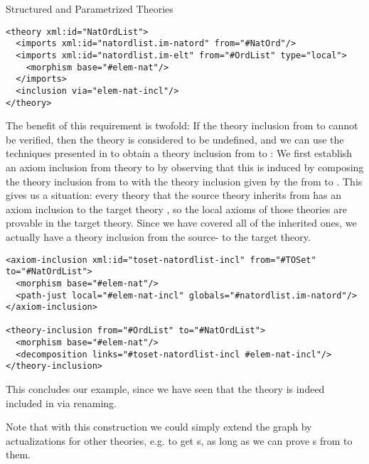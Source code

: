\begin{tchapter}[id=natlist]{Structured and Parametrized Theories}
\begin{lstlisting}[mathescape,label=lst:nat-list,
  index={theory,imports,morphism,inclusion}]
<theory xml:id="NatOrdList">
  <imports xml:id="natordlist.im-natord" from="#NatOrd"/>
  <imports xml:id="natordlist.im-elt" from="#OrdList" type="local">
    <morphism base="#elem-nat"/>
  </imports>
  <inclusion via="elem-nat-incl"/>
</theory>
\end{lstlisting}
The benefit of this {} requirement is twofold: If the theory inclusion
from {} to {} cannot be verified, then the theory
{} is considered to be undefined, and we can use the
{} techniques presented in {} to
obtain a theory inclusion from {} to {}: We first
establish an axiom inclusion from theory {} to {} by
observing that this is induced by composing the theory inclusion from {} to
{} with the theory inclusion given by the {} from
{} to {}. This gives us a
{} situation: every theory that the source theory {}
inherits from has an axiom inclusion to the target theory {}, so the
local axioms of those theories are provable in the target theory. Since we have covered
all of the inherited ones, we actually have a theory inclusion from the source- to the
target theory.

\begin{lstlisting}[mathescape,label=lst:nat-list-inclusions,
  index={theory,imports,morphism,inclusion}]
<axiom-inclusion xml:id="toset-natordlist-incl" from="#TOSet" to="#NatOrdList">
  <morphism base="#elem-nat"/>
  <path-just local="#elem-nat-incl" globals="#natordlist.im-natord"/>
</axiom-inclusion>

<theory-inclusion from="#OrdList" to="#NatOrdList">
  <morphism base="#elem-nat"/>
  <decomposition links="#toset-natordlist-incl #elem-nat-incl"/>
</theory-inclusion>
\end{lstlisting}

This concludes our example, since we have seen that the theory {} is
indeed included in {} via renaming.

Note that with this construction we could simply extend the graph by actualizations for
other theories, e.g. to get {s}, as long as we can prove
{s} from {} to them.
\end{tchapter}

